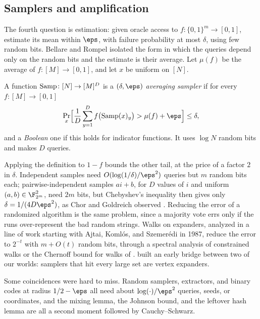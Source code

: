 \begin{refsection}
\subsection{Samplers and amplification}\label{sec:pseudorandom:samplers}

The fourth question is estimation: given oracle access to $f\colon\{0,1\}^m\to[0,1]$, estimate its mean within $\eps$, with failure probability at most $\delta$, using few random bits. Bellare and Rompel isolated the form in which the queries depend only on the random bits and the estimate is their average. Let $\mu(f)$ be the average of $f\colon[M]\to[0,1]$, and let $x$ be uniform on $[N]$.

\begin{definition}\label{def:pseudorandom:sampler}
A function $\operatorname{Samp}\colon[N]\to[M]^D$ is a \emph{$(\delta,\eps)$ averaging sampler} if for every $f\colon[M]\to[0,1]$
\[
  \Pr_x\Bigl[\frac1D\sum_{y=1}^Df\bigl(\pseudorandomSamp(x)_y\bigr)>\mu(f)+\eps\Bigr]\le\delta ,
\]
and a \emph{Boolean} one if this holds for indicator functions. It uses $\log N$ random bits and makes $D$ queries.
\end{definition}

Applying the definition to $1-f$ bounds the other tail, at the price of a factor $2$ in $\delta$. Independent samples need $O(\log(1/\delta)/\eps^2)$ queries but $m$ random bits each; pairwise-independent samples $ai+b$, for $D$ values of $i$ and uniform $(a,b)\in\F_{2^m}^2$, need $2m$ bits, but Chebyshev's inequality then gives only $\delta=1/(4D\eps^2)$, as Chor and Goldreich observed \parencite[\S3.5]{Vadhan2012}. Reducing the error of a randomized algorithm is the same problem, since a majority vote errs only if the runs over-represent the bad random strings. Walks on expanders, analyzed in a line of work starting with Ajtai, Koml\'os, and Szemer\'edi in 1987, reduce the error to $2^{-t}$ with $m+O(t)$ random bits, through a spectral analysis of constrained walks or the Chernoff bound for walks of \textcite{Gillman1998} \parencite[\S4.6]{Vadhan2012}. \textcite{Sipser1988} built an early bridge between two of our worlds: samplers that hit every large set are vertex expanders.

Some coincidences were hard to miss. Random samplers, extractors, and binary codes at radius $1/2-\eps$ all need about $\log(\cdot)/\eps^2$ queries, seeds, or coordinates, and the mixing lemma, the Johnson bound, and the leftover hash lemma are all a second moment followed by Cauchy--Schwarz.


\end{refsection}
